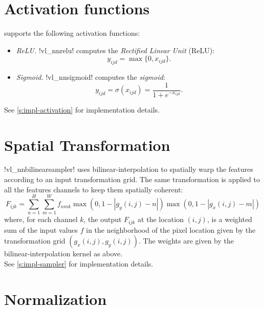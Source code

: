 \section{Activation functions}\label{s:activation}

\matconvnet supports the following activation functions:
%
\begin{itemize}
\item \emph{ReLU.} !vl_nnrelu! computes the \emph{Rectified Linear Unit} (ReLU):
\[
 y_{ijd} = \max\{0, x_{ijd}\}.
\]

\item \emph{Sigmoid.} !vl_nnsigmoid! computes the \emph{sigmoid}:
\[
 y_{ijd} = \sigma(x_{ijd}) = \frac{1}{1+e^{-x_{ijd}}}.
\]
\end{itemize}
%
See \cref{s:impl-activation} for implementation details.

\section{Spatial Transformation}\label{s:sampler}
!vl_nnbilinearsampler! uses bilinear-interpolation to spatially warp the features according to an input transformation grid.
The same transformation is applied to all the features channels to keep them spatially coherent:
\[
  F_{ijk} = \sum_{n=1}^H\sum_{m=1}^W f_{nmk} \max(0, 1-|g_y(i,j)-n|) \max(0, 1-|g_x(i,j)-m|)
\]
where, for each channel $k$, the output $F_{ijk}$ at the location $(i,j)$, is a weighted sum of 
the input values $f$ in the neighborhood of the pixel location given by the transformation grid
$(g_x(i,j), g_y(i,j))$. The weights are given by the bilinear-interpolation kernel as above.\\

See \cref{s:impl-sampler} for implementation details.

\section{Normalization}\label{s:normalization}

